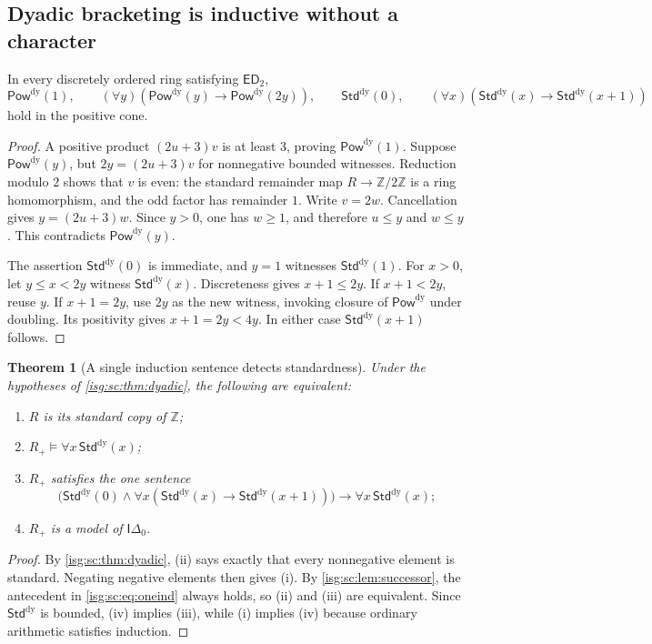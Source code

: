 \documentclass[11pt]{article}
\newtheorem{theorem}{Theorem}[section]
\theoremstyle{definition}
\theoremstyle{remark}
\newcommand{\Z}{\mathbb{Z}}
\newcommand{\PowDy}{\mathsf{Pow}^{\mathrm{dy}}}
\newcommand{\StdDy}{\mathsf{Std}^{\mathrm{dy}}}
\newcommand{\ED}{\mathsf{ED}}
\newcommand{\Idelta}{\mathsf{I}\Delta_0}
\begin{document}
\subsection{Dyadic bracketing is inductive without a character}\label{isg:sc:sec:inductive}

\begin{lemma}\label{isg:sc:lem:successor}
In every discretely ordered ring satisfying $\ED_2$,
\[
 \PowDy(1),\qquad
 (\forall y)(\PowDy(y)\to\PowDy(2y)),\qquad
 \StdDy(0),\qquad
 (\forall x)(\StdDy(x)\to\StdDy(x+1))
\]
hold in the positive cone.
\end{lemma}
\begin{proof}
A positive product $(2u+3)v$ is at least $3$, proving $\PowDy(1)$.
Suppose $\PowDy(y)$, but $2y=(2u+3)v$ for nonnegative bounded witnesses.
Reduction modulo $2$ shows that $v$ is even: the standard remainder map
$R\to\Z/2\Z$ is a ring homomorphism, and the odd factor has remainder $1$.
Write $v=2w$. Cancellation gives $y=(2u+3)w$. Since $y>0$, one has
$w\ge1$, and therefore $u\le y$ and $w\le y$. This contradicts
$\PowDy(y)$.

The assertion $\StdDy(0)$ is immediate, and $y=1$ witnesses $\StdDy(1)$.
For $x>0$, let $y\le x<2y$ witness $\StdDy(x)$. Discreteness gives
$x+1\le2y$. If $x+1<2y$, reuse $y$. If $x+1=2y$, use $2y$ as the new
witness, invoking closure of $\PowDy$ under doubling. Its positivity gives
$x+1=2y<4y$. In either case $\StdDy(x+1)$ follows.
\end{proof}

\begin{theorem}[A single induction sentence detects standardness]\label{isg:sc:thm:boundary}
Under the hypotheses of \cref{isg:sc:thm:dyadic}, the following are
equivalent:
\begin{enumerate}[label=\textup{(\roman*)},nosep]
\item $R$ is its standard copy of $\Z$;
\item $R_+\models\forall x\,\StdDy(x)$;
\item $R_+$ satisfies the one sentence
\begin{equation}\label{isg:sc:eq:oneind}
\bigl(\StdDy(0)\wedge\forall x(\StdDy(x)\to\StdDy(x+1))\bigr)
       \longrightarrow\forall x\,\StdDy(x);
\end{equation}
\item $R_+$ is a model of $\Idelta$.
\end{enumerate}
\end{theorem}
\begin{proof}
By \cref{isg:sc:thm:dyadic}, (ii) says exactly that every nonnegative
element is standard. Negating negative elements then gives (i). By
\cref{isg:sc:lem:successor}, the antecedent in \eqref{isg:sc:eq:oneind}
always holds, so (ii) and (iii) are equivalent. Since $\StdDy$ is bounded,
(iv) implies (iii), while (i) implies (iv) because ordinary arithmetic
satisfies induction.
\end{proof}
\end{document}
